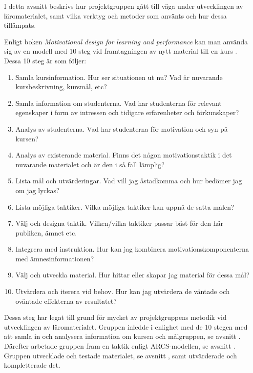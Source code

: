 \documentclass[12pt,a4paper,twoside,openright]{article}
\begin{document}
I detta avsnitt beskrivs hur projektgruppen gått till väga under
utvecklingen av läromaterialet, samt vilka verktyg och metoder som
använts och hur dessa tillämpats.

Enligt boken \textit{Motivational design for learning and performance}
kan man använda sig av en modell med 10 steg vid framtagningen av nytt
material till en kurs \cite{motivational_design}. Dessa 10 steg är som
följer:

\begin{enumerate}
\item Samla kursinformation. Hur ser situationen ut nu? Vad är
  nuvarande kursbeskrivning, kursmål, etc?

\item Samla information om studenterna. Vad har studenterna för
  relevant egenskaper i form av intressen och tidigare erfarenheter
  och förkunskaper?

\item Analys av studenterna. Vad har studenterna för motivation och
  syn på kursen?

\item Analys av existerande material. Finns det någon
  motivationstaktik i det nuvarande materialet och är den i så fall
  lämplig?

\item Lista mål och utvärderingar. Vad vill jag åstadkomma och hur
  bedömer jag om jag lyckas?

\item Lista möjliga taktiker. Vilka möjliga taktiker kan uppnå de
  satta målen?

\item Välj och designa taktik. Vilken/vilka taktiker passar bäst för
  den här publiken, ämnet etc.

\item Integrera med instruktion. Hur kan jag kombinera
  motivationskomponenterna med ämnesinformationen?

\item Välj och utveckla material. Hur hittar eller skapar jag material
  för dessa mål?

\item Utvärdera och iterera vid behov. Hur kan jag utvärdera de
  väntade och oväntade effekterna av resultatet?

\end{enumerate}

Dessa steg har legat till grund för mycket av projektgruppens metodik
vid utvecklingen av läromaterialet. Gruppen inledde i enlighet med de
10 stegen med att samla in och analysera information om kursen och
målgruppen, se avsnitt . Därefter
arbetade gruppen fram en taktik enligt ARCS-modellen, se avsnitt
. Gruppen utvecklade och testade materialet,
se avsnitt , samt utvärderade och kompletterade
det.
\end{document}
